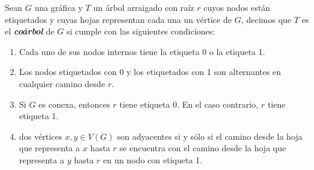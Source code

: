  Sean $G$ una gráfica y $T$ un árbol arraigado con raíz $r$ cuyos nodos están etiquetados y cuyas hojas representan cada una un vértice de $G$, decimos que $T$ es el \emph{\textbf{coárbol}} de $G$ si cumple con las siguientes condiciones:
 \begin{enumerate}
     \item Cada uno de sus nodos internos tiene la etiqueta 0 o la etiqueta 1.
     \item Los nodos etiquetados con 0 y los etiquetados con 1 son alternantes en cualquier camino desde $r$.
     \item Si $G$ es conexa, entonces $r$ tiene etiqueta 0. En el caso contrario, $r$ tiene etiqueta 1.
     \item dos vértices $x,y \in V(G)$ son adyacentes si y sólo si el camino desde la hoja que representa a $x$ hasta $r$ se encuentra con el camino desde la hoja que representa a $y$ hasta $r$ en un nodo con etiqueta 1.
 \end{enumerate}



